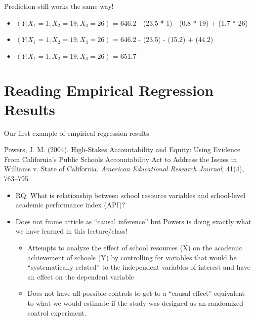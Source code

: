 \documentclass[
  8pt,
  ignorenonframetext,
  dvipsnames]{beamer}
\providecommand{\tightlist}{%
  \setlength{\itemsep}{0pt}\setlength{\parskip}{0pt}}
\let\olditem\item
\renewcommand{\item}{%
  \olditem\vspace{4pt}
}
\begin{document}
\begin{frame}{Prediction still works the same way!}
\begin{itemize}
  \begin{itemize}
  \tightlist
  \item
    \((Y| X_1=1, X_2=19, X_3=26)\) = 646.2 - (23.5 * 1) - (0.8 * 19) +
    (1.7 * 26)
  \item
    \((Y| X_1=1, X_2=19, X_3=26)\) = 646.2 - (23.5) - (15.2) + (44.2)
  \item
    \((Y| X_1=1, X_2=19, X_3=26)\) = 651.7
  \end{itemize}
\end{itemize}

\end{frame}

\hypertarget{reading-empirical-regression-results}{%
\section{Reading Empirical Regression
Results}\label{reading-empirical-regression-results}}

\begin{frame}{Our first example of empirical regression results}
\protect\hypertarget{our-first-example-of-empirical-regression-results}{}

Powers, J. M. (2004). High-Stakes Accountability and Equity: Using
Evidence From California's Public Schools Accountability Act to Address
the Issues in Williams v. State of California. \emph{American
Educational Research Journal}, 41(4), 763--795.

\medskip

\begin{itemize}
\tightlist
\item
  RQ: What is relationship between school resource variables and
  school-level academic performance index (API)?
\item
  Does not frame article as ``causal inference'' but Powers is doing
  exactly what we have learned in this lecture/class!

  \begin{itemize}
  \tightlist
  \item
    Attempts to analyze the effect of school resources (X) on the
    academic achievement of schools (Y) by controlling for variables
    that would be ``systematically related'' to the independent
    variables of interest and have an effect on the dependent variable
  \item
    Does not have all possible controls to get to a ``causal effect''
    equivalent to what we would estimate if the study was designed as an
    randomized control experiment.
  \end{itemize}
\end{itemize}

\end{frame}
\end{document}
